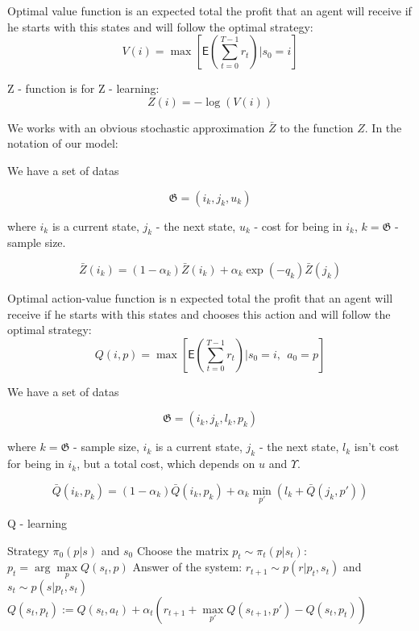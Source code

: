 \documentclass[12pt,twoside]{article}
\begin{document}
\begin{Def}
Optimal value function is an  expected total the profit that an agent will receive if he starts with this states and will follow the optimal strategy:
\begin{equation}
V(i) = \max \left[\mathsf{E}\left(\sum\limits_{t=0}^{T-1} r_t \right) | s_0 = i\right]
\end{equation}

Z - function is for Z - learning:
\begin{equation}
Z(i) = - \log(V(i)) 
\end{equation}
\end{Def}

We works with an obvious stochastic approximation $\bar Z$ to the function $Z$. In the notation of our model:

We have a set of datas 

$$\mathfrak{G} = (i_k, j_k, u_k)$$

where $i_k$ is a current state, $j_k$ - the next state, $u_k$ - cost for being in $i_k$, $k = \mathfrak{G}$ - sample size.

\begin{equation}
\bar Z(i_k) = (1 - \alpha_k)\bar Z(i_k) + \alpha_k \exp(-q_k)\bar Z(j_k)
\end{equation}

\begin{Def}
Optimal action-value function is n  expected total the profit that an agent will receive if he starts with this states and chooses this action and will follow the optimal strategy:
\begin{equation}
Q(i,p) = \max \left[\mathsf{E}\left(\sum\limits_{t=0}^{T-1} r_t \right) | s_0 = i,~~a_0 = p\right]
\end{equation}
\end{Def}

We have a set of datas 

$$\mathfrak{G} = (i_k, j_k, l_k, p_k)$$

where $k = \mathfrak{G}$ - sample size, $i_k$ is a current state, $j_k$ - the next state, $l_k$ isn't cost for being in $i_k$, but a total cost, which depends on $u$ and $\Upsilon$.

\begin{equation}
\bar Q(i_k, p_k) = (1 - \alpha_k)\bar Q(i_k, p_k) + \alpha_k \min\limits_{p'}(l_k + \bar Q(j_k, p'))
\end{equation}

\begin{algorithm}[h]
	\caption{Q - learning}
	\label{alg:Q}
	\begin{algorithmic}[1]
          Strategy $\pi_0(p|s)$ and $s_0$
		\STATE Choose the matrix $p_t \sim \pi_t(p|s_t)$:\\
		$p_t = \arg \max\limits_{p} Q(s_t,p)$
		\STATE Answer of the system: $r_{t+1} \sim p(r|p_t, s_t)$ and $s_t \sim p(s|p_t, s_t)$
		\STATE $Q(s_t, p_t) := Q(s_t, a_t) + \alpha_t(r_{t+1} + \max\limits_{p'}Q(s_{t+1}, p') - Q(s_t, p_t))$
		\ENDFOR
	\end{algorithmic}
\end{algorithm}



\end{document}
